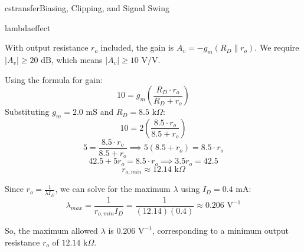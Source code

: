 \begin{mainquestion}{cstransfer}{Biasing, Clipping, and Signal Swing}
\begin{partquestion}{lambdaeffect}
\begin{answer}
        With output resistance $r_o$ included, the gain is $A_v = -g_m(R_D \parallel r_o)$. 
        We require $|A_v| \ge 20 \text{ dB}$, which means $|A_v| \ge 10 \text{ V/V}$.
        
        Using the formula for gain:
        \[10 = g_m \left( \frac{R_D \cdot r_o}{R_D + r_o} \right)\]
        Substituting $g_m = 2.0 \text{ mS}$ and $R_D = 8.5 \text{ k}\Omega$:
        \[10 = 2 \left( \frac{8.5 \cdot r_o}{8.5 + r_o} \right)\]
        \[5 = \frac{8.5 \cdot r_o}{8.5 + r_o} \implies 5(8.5 + r_o) = 8.5 \cdot r_o\]
        \[42.5 + 5r_o = 8.5 \cdot r_o \implies 3.5r_o = 42.5\]
        \[r_{o,min} \approx 12.14 \text{ k}\Omega\]
        
        Since $r_o = \frac{1}{\lambda I_D}$, we can solve for the maximum $\lambda$ using $I_D = 0.4 \text{ mA}$:
        \[\lambda_{max} = \frac{1}{r_{o,min} I_D} = \frac{1}{(12.14)(0.4)} \approx 0.206 \text{ V}^{-1}\]
        
        So, the maximum allowed $\lambda$ is $0.206 \text{ V}^{-1}$, corresponding to a minimum output resistance $r_o$ of $12.14 \text{ k}\Omega$.
\end{answer}

\end{partquestion}

\end{mainquestion}

